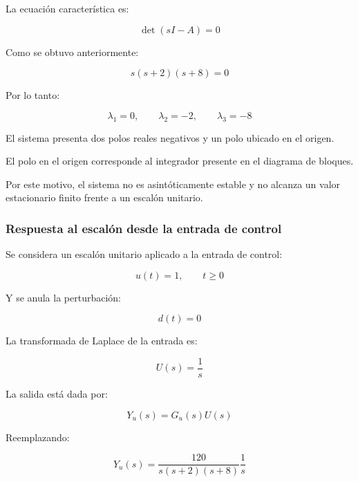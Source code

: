 \documentclass[12pt,a4paper]{article}
\begin{document}
La ecuación característica es:

\begin{equation}\det(sI-A)=0\end{equation}

Como se obtuvo anteriormente:

\begin{equation}s(s+2)(s+8)=0\end{equation}

Por lo tanto:

\begin{equation}\boxed{\lambda_1=0,\qquad \lambda_2=-2,\qquad \lambda_3=-8}\end{equation}

El sistema presenta dos polos reales negativos y un polo ubicado en el origen.

El polo en el origen corresponde al integrador presente en el diagrama de bloques.

Por este motivo, el sistema no es asintóticamente estable y no alcanza un valor estacionario finito frente a un escalón unitario.
\subsubsection*{Respuesta al escalón desde la entrada de control}
Se considera un escalón unitario aplicado a la entrada de control:

\begin{equation}u(t)=1,\qquad t\geq0\end{equation}

Y se anula la perturbación:

\begin{equation}d(t)=0\end{equation}

La transformada de Laplace de la entrada es:

\begin{equation}U(s)=\frac{1}{s}\end{equation}

La salida está dada por:

\begin{equation}Y_u(s)=G_u(s)U(s)\end{equation}

Reemplazando:

\begin{equation}Y_u(s)=\frac{120}{s(s+2)(s+8)} \frac{1}{s}\end{equation}
\end{document}

